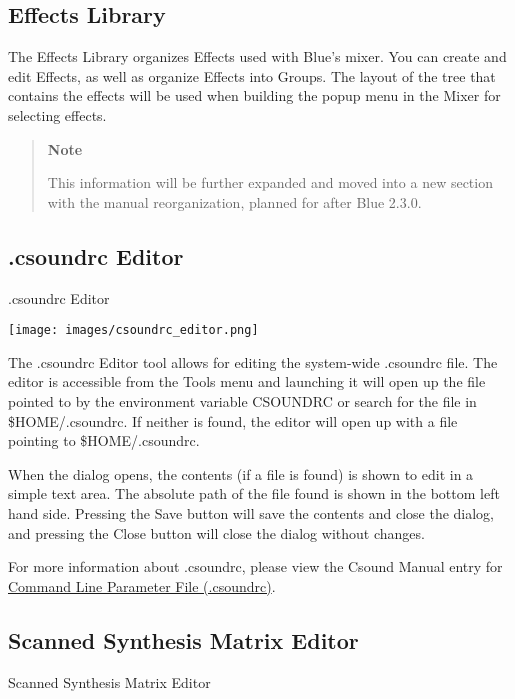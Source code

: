 \subsection{Effects Library}\label{effectsLibrary}

The Effects Library organizes Effects used with Blue's mixer. You can
create and edit Effects, as well as organize Effects into Groups. The
layout of the tree that contains the effects will be used when building
the popup menu in the Mixer for selecting effects.

\begin{quote}
\textbf{Note}

This information will be further expanded and moved into a new section
with the manual reorganization, planned for after Blue 2.3.0.
\end{quote}

\subsection{.csoundrc Editor}\label{csoundrcEditor}

.csoundrc Editor

\texttt{[image: images/csoundrc\_editor.png]}

The .csoundrc Editor tool allows for editing the system-wide .csoundrc
file. The editor is accessible from the Tools menu and launching it will
open up the file pointed to by the environment variable CSOUNDRC or
search for the file in \$HOME/.csoundrc. If neither is found, the editor
will open up with a file pointing to \$HOME/.csoundrc.

When the dialog opens, the contents (if a file is found) is shown to
edit in a simple text area. The absolute path of the file found is shown
in the bottom left hand side. Pressing the Save button will save the
contents and close the dialog, and pressing the Close button will close
the dialog without changes.

For more information about .csoundrc, please view the Csound Manual
entry for
\href{http://www.csounds.com/manual/html/CommandUnifileParFile.html}{Command
Line Parameter File (.csoundrc)}.

\subsection{Scanned Synthesis Matrix Editor}\label{scannedSynthesisMatrixEditor}

Scanned Synthesis Matrix Editor

